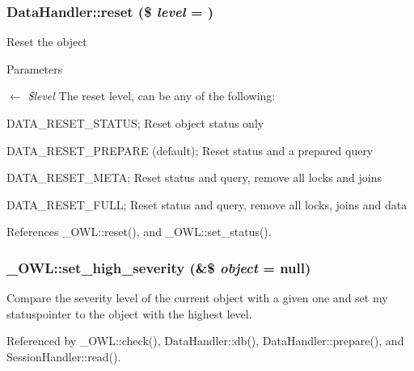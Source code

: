 \subsubsection[{reset}]{\setlength{\rightskip}{0pt plus 5cm}DataHandler::reset (\$ {\em level} = {})}\label{classDataHandler_ab89e1aaad9cd0a37f1c7f13c1d9c0d57}
Reset the object 
\begin{DoxyParams}{Parameters}
\item[\mbox{$\leftarrow$} {\em \$level}]The reset level, can be any of the following:
\begin{DoxyItemize}
\item DATA\_\-RESET\_\-STATUS; Reset object status only
\item DATA\_\-RESET\_\-PREPARE (default); Reset status and a prepared query
\item DATA\_\-RESET\_\-META; Reset status and query, remove all locks and joins
\item DATA\_\-RESET\_\-FULL; Reset status and query, remove all locks, joins and data 
\end{DoxyItemize}\end{DoxyParams}


References \_\-OWL::reset(), and \_\-OWL::set\_\-status().

\subsubsection[{set\_\-high\_\-severity}]{\setlength{\rightskip}{0pt plus 5cm}\_\-OWL::set\_\-high\_\-severity (\&\$ {\em object} = {\ttfamily null})}\label{class__OWL_a576829692a3b66e3d518853bf43abae3}
Compare the severity level of the current object with a given one and set my statuspointer to the object with the highest level. 

Referenced by \_\-OWL::check(), DataHandler::db(), DataHandler::prepare(), and SessionHandler::read().

